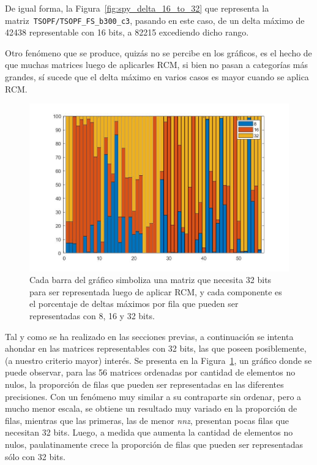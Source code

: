 De igual forma, la Figura~\ref{fig:spy_delta_16_to_32} que representa la matriz~\texttt{TSOPF/TSOPF\_FS\_b300\_c3}, pasando en este caso, de un delta máximo de 42438 representable con 16 bits, a 82215 excediendo dicho rango.



Otro fenómeno que se produce, quizás no se percibe en los gráficos, es el hecho de que muchas matrices luego de aplicarles RCM, si bien no pasan a categorías más grandes, sí sucede que el delta máximo en varios casos es mayor cuando se aplica RCM.


\begin{figure}
    \centering
    \includegraphics[width=.7\textwidth]{imagenes/chap4/delta_bar_row_porc_per_cat_32_rcm.jpg}
    \caption{Cada barra del gráfico simboliza una matriz que necesita 32 bits para ser representada luego de aplicar RCM, y cada componente es el porcentaje de deltas máximos por fila que pueden ser representadas con 8, 16 y 32 bits.}
    \label{fig:delta_bar_row_porc_per_cat_32_rcm}
\end{figure}

Tal y como se ha realizado en las secciones previas, a continuación se intenta ahondar en las matrices representables con 32 bits, las que poseen posiblemente, (a nuestro criterio mayor) interés. Se presenta en la Figura~\ref{fig:delta_bar_row_porc_per_cat_32_rcm}, un gráfico donde se puede observar, para las 56 matrices ordenadas por cantidad de elementos no nulos, la proporción de filas que pueden ser representadas en las diferentes precisiones. Con un fenómeno muy similar a su contraparte sin ordenar, pero a mucho menor escala, se obtiene un resultado muy variado en la proporción de filas, mientras que las primeras, las de menor \textit{nnz}, presentan pocas filas que necesitan 32 bits. Luego, a medida que aumenta la cantidad de elementos no nulos, paulatinamente crece la proporción de filas que pueden ser representadas sólo con 32 bits.



